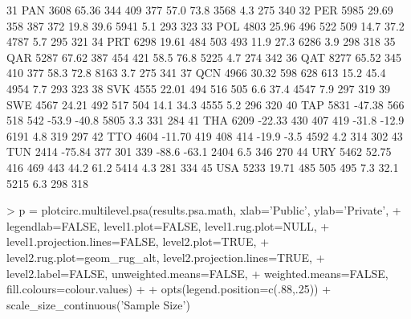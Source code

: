 \documentclass[letterpaper,11pt]{article}
\begin{document}
\begin{Schunk}
\begin{Soutput}
31    PAN  3608   65.36 344 409  377   57.0   73.8  3568    4.3   275   340
32    PER  5985   29.69 358 387  372   19.8   39.6  5941    5.1   293   323
33    POL  4803   25.96 496 522  509   14.7   37.2  4787    5.7   295   321
34    PRT  6298   19.61 484 503  493   11.9   27.3  6286    3.9   298   318
35    QAR  5287   67.62 387 454  421   58.5   76.8  5225    4.7   274   342
36    QAT  8277   65.52 345 410  377   58.3   72.8  8163    3.7   275   341
37    QCN  4966   30.32 598 628  613   15.2   45.4  4954    7.7   293   323
38    SVK  4555   22.01 494 516  505    6.6   37.4  4547    7.9   297   319
39    SWE  4567   24.21 492 517  504   14.1   34.3  4555    5.2   296   320
40    TAP  5831  -47.38 566 518  542  -53.9  -40.8  5805    3.3   331   284
41    THA  6209  -22.33 430 407  419  -31.8  -12.9  6191    4.8   319   297
42    TTO  4604  -11.70 419 408  414  -19.9   -3.5  4592    4.2   314   302
43    TUN  2414  -75.84 377 301  339  -88.6  -63.1  2404    6.5   346   270
44    URY  5462   52.75 416 469  443   44.2   61.2  5414    4.3   281   334
45    USA  5233   19.71 485 505  495    7.3   32.1  5215    6.3   298   318
\end{Soutput}
\end{Schunk}

\begin{Schunk}
\begin{Sinput}
> p = plotcirc.multilevel.psa(results.psa.math, xlab='Public', ylab='Private', 
+ legendlab=FALSE, level1.plot=FALSE, level1.rug.plot=NULL, 
+ level1.projection.lines=FALSE, level2.plot=TRUE, 
+ level2.rug.plot=geom_rug_alt, level2.projection.lines=TRUE, 
+ level2.label=FALSE, unweighted.means=FALSE, 
+ weighted.means=FALSE, fill.colours=colour.values) + 
+ opts(legend.position=c(.88,.25)) +  scale_size_continuous('Sample Size')
\end{Sinput}
\end{Schunk}
\end{document}
